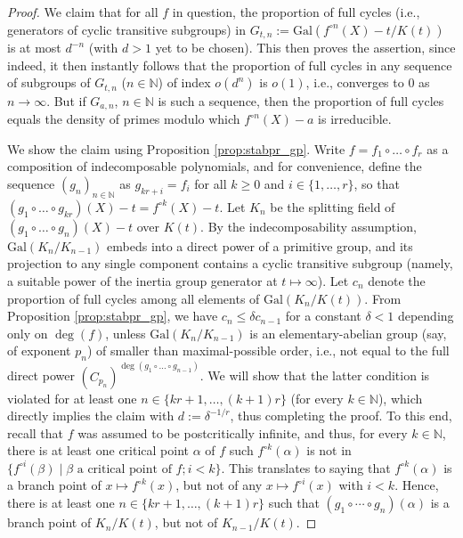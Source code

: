 \documentclass[a4paper]{amsart}
\begin{document}
  \begin{proof}
  We claim that for all $f$ in question, the proportion of full cycles (i.e., generators of cyclic transitive subgroups) in $G_{t,n}:=\mathrm{Gal}(f^{\circ n}(X)-t/K(t))$ is at most $d^{-n}$ (with $d>1$ yet to be chosen). 
  This then proves the assertion, since indeed, it then instantly follows that the proportion of full cycles in any sequence of subgroups of $G_{t, n}$ ($n\in \mathbb{N}$) of index $o(d^n)$ is $o(1)$, i.e., converges to $0$ as $n\to \infty$. But if $G_{a,n}$, $n\in \mathbb{N}$ is such a sequence, then the proportion of full cycles equals the density of primes modulo which $f^{\circ n}(X)-a$ is irreducible. 
  
  We show the claim using Proposition \ref{prop:stabpr_gp}. %
 Write $f = f_1\circ\dots\circ f_r$ as a composition of indecomposable polynomials, and for convenience, define the sequence $(g_n)_{n\in \mathbb{N}}$ as $g_{kr+i}=f_i$ for all $k\ge 0$ and $i\in \{1,\dots, r\}$, so that $(g_1\circ\dots\circ g_{kr})(X)-t = f^{\circ k}(X)-t$. Let $K_n$ be the splitting field of $(g_1\circ\dots\circ g_n)(X)-t$ over $K(t)$. By the indecomposability assumption, $\textrm{Gal}(K_n/K_{n-1})$ embeds into a direct power of a primitive group, and its projection to any single component contains a cyclic transitive subgroup (namely, a suitable power of the inertia group generator at $t\mapsto \infty$). Let $c_n$ denote the proportion of full cycles among all elements of $\textrm{Gal}(K_n/K(t))$. From Proposition \ref{prop:stabpr_gp}, we have $c_n\le \delta c_{n-1}$ for a constant $\delta<1$ depending only on $\deg(f)$, unless $\textrm{Gal}(K_n/K_{n-1})$ is an elementary-abelian group (say, of exponent $p_n$) of smaller than maximal-possible order, i.e., not equal to the full direct power $(C_{p_n})^{\deg(g_1\circ\dots\circ g_{n-1})}$. We will show that the latter condition is violated for at least one $n\in \{kr+1,\dots, (k+1)r\}$ (for every $k\in \mathbb{N}$), which directly implies the claim with $d:=\delta^{-1/r}$, thus completing the proof. 
 To this end, recall that $f$ was assumed to be postcritically infinite, and thus, for every $k\in \mathbb{N}$, there is at least one critical point $\alpha$ of $f$ such $f^{\circ k}(\alpha)$ is not in $\{f^{\circ i}(\beta)\mid \beta \text{ a critical point of } f; i<k\}$. This translates to saying that $f^{\circ k}(\alpha)$ is a branch point of $x\mapsto f^{\circ k}(x)$, but not of any $x\mapsto f^{\circ i}(x)$  with $i<k$. Hence, there is at least one $n\in \{kr+1,\dots, (k+1)r\}$ such that $(g_1\circ \cdots \circ g_n)(\alpha)$ is a branch point of $K_n/K(t)$, but not of $K_{n-1}/K(t)$. 

\end{proof}
\end{document}
